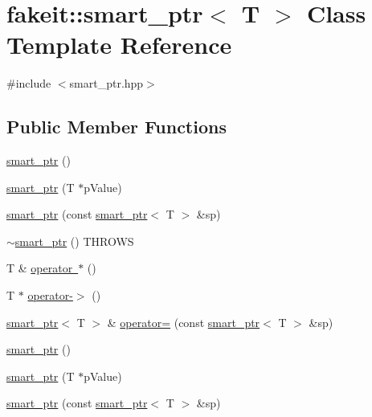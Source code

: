 \hypertarget{classfakeit_1_1smart__ptr}{}\section{fakeit\+::smart\+\_\+ptr$<$ T $>$ Class Template Reference}
\label{classfakeit_1_1smart__ptr}


{\ttfamily \#include $<$smart\+\_\+ptr.\+hpp$>$}

\subsection*{Public Member Functions}
\begin{DoxyCompactItemize}
\item 
\mbox{\hyperlink{classfakeit_1_1smart__ptr_ad718f001e0b0815c80d5cef4f2d4a99a}{smart\+\_\+ptr}} ()
\item 
\mbox{\hyperlink{classfakeit_1_1smart__ptr_afa05248e2dceb62a7ecc706700cfd1bf}{smart\+\_\+ptr}} (T $\ast$p\+Value)
\item 
\mbox{\hyperlink{classfakeit_1_1smart__ptr_a1157d28b4675e32ae90886871fb1b0bd}{smart\+\_\+ptr}} (const \mbox{\hyperlink{classfakeit_1_1smart__ptr}{smart\+\_\+ptr}}$<$ T $>$ \&sp)
\item 
\mbox{\hyperlink{classfakeit_1_1smart__ptr_a0a184c081564a5a22d8ad0a121614bc5}{$\sim$smart\+\_\+ptr}} () T\+H\+R\+O\+WS
\item 
T \& \mbox{\hyperlink{classfakeit_1_1smart__ptr_a6ad907f45c59a2519248f5a79191992e}{operator $\ast$}} ()
\item 
T $\ast$ \mbox{\hyperlink{classfakeit_1_1smart__ptr_aa9b3019d80eee2f376a9b92ef8080ffc}{operator-\/$>$}} ()
\item 
\mbox{\hyperlink{classfakeit_1_1smart__ptr}{smart\+\_\+ptr}}$<$ T $>$ \& \mbox{\hyperlink{classfakeit_1_1smart__ptr_a76edf2172f564378c77dc88a419f6634}{operator=}} (const \mbox{\hyperlink{classfakeit_1_1smart__ptr}{smart\+\_\+ptr}}$<$ T $>$ \&sp)
\item 
\mbox{\hyperlink{classfakeit_1_1smart__ptr_ad718f001e0b0815c80d5cef4f2d4a99a}{smart\+\_\+ptr}} ()
\item 
\mbox{\hyperlink{classfakeit_1_1smart__ptr_afa05248e2dceb62a7ecc706700cfd1bf}{smart\+\_\+ptr}} (T $\ast$p\+Value)
\item 
\mbox{\hyperlink{classfakeit_1_1smart__ptr_a1157d28b4675e32ae90886871fb1b0bd}{smart\+\_\+ptr}} (const \mbox{\hyperlink{classfakeit_1_1smart__ptr}{smart\+\_\+ptr}}$<$ T $>$ \&sp)
\item 

\end{DoxyCompactItemize}
